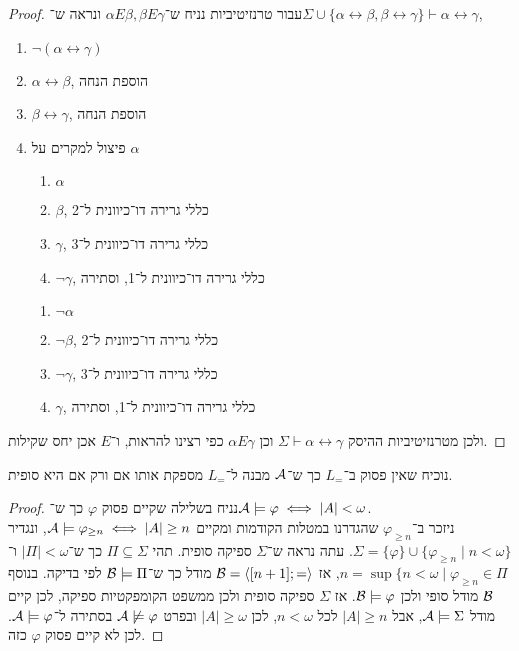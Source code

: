 \begin{proof}
	עבור טרנזיטיביות נניח ש־$\alpha E \beta, \beta E \gamma$ ונראה ש־$\Sigma \cup \{ \alpha \leftrightarrow \beta, \beta \leftrightarrow \gamma \} \vdash \alpha \leftrightarrow \gamma$,
	\begin{enumerate}
		\item $\lnot (\alpha \leftrightarrow \gamma)$
		\item $\alpha \leftrightarrow \beta$, הוספת הנחה
		\item $\beta \leftrightarrow \gamma$, הוספת הנחה
		\item פיצול למקרים על $\alpha$
			\begin{enumerate}
				\item $\alpha$
				\item $\beta$, כללי גרירה דו־כיוונית ל־2
				\item $\gamma$, כללי גרירה דו־כיוונית ל־3
				\item $\lnot \gamma$, כללי גרירה דו־כיוונית ל־1, וסתירה
			\end{enumerate}
			\begin{enumerate}
				\item $\lnot \alpha$
				\item $\lnot \beta$, כללי גרירה דו־כיוונית ל־2
				\item $\lnot \gamma$, כללי גרירה דו־כיוונית ל־3
				\item $\gamma$, כללי גרירה דו־כיוונית ל־1, וסתירה
			\end{enumerate}
	\end{enumerate}
	ולכן מטרנזיטיביות ההיסק $\Sigma \vdash \alpha \leftrightarrow \gamma$ וכן $\alpha E \gamma$ כפי רצינו להראות, ו־$E$ אכן יחס שקילות.
\end{proof}

\question{}
\subquestion{}
נוכיח שאין פסוק ב־$L_=$ כך ש־$\mathcal{A}$ מבנה ל־$L_=$ מספקת אותו אם ורק אם היא סופית.
\begin{proof}
	נניח בשלילה שקיים פסוק $\varphi$ כך ש־$\mathcal{A} \models \varphi \iff |A| < \omega$. \\
	ניזכר ב־$\varphi_{\ge n}$ שהגדרנו במטלות הקודמות ומקיים $\mathcal{A} \models \varphi_{\ge n} \iff |A| \ge n$,
	ונגדיר $\Sigma = \{ \varphi \} \cup \{ \varphi_{\ge n} \mid n < \omega \}$.
	עתה נראה ש־$\Sigma$ ספיקה סופית. תהי $\Pi \subseteq \Sigma$ כך ש־$|\Pi| < \omega$ ו־$n = \sup \{ n < \omega \mid \varphi_{\ge n} \in \Pi$, אז $\mathcal{B} = \langle [n + 1]; = \rangle$ מודל כך ש־$\mathcal{B} \models \Pi$ לפי בדיקה.
	בנוסף $\mathcal{B}$ מודל סופי ולכן $\mathcal{B} \models \varphi$.
	אז $\Sigma$ ספיקה סופית ולכן ממשפט הקומפקטיות ספיקה, לכן קיים מודל $\mathcal{A} \models \Sigma$, אבל $|A| \ge n$ לכל $n < \omega$, לכן $|A| \ge \omega$ ובפרט $\mathcal{A} \not\models \varphi$ בסתירה ל־$\mathcal{A} \models \varphi$.
	לכן לא קיים פסוק $\varphi$ כזה.
\end{proof}

